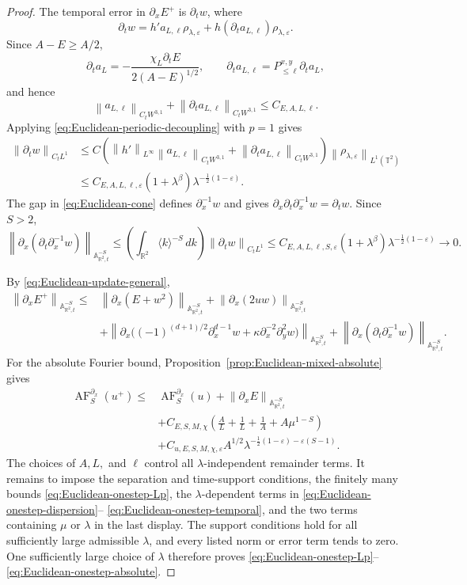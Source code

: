 \documentclass[10pt,a4paper]{amsart}
\newcommand{\A}{\mathbb A}
\newcommand{\R}{\mathbb R}
\newcommand{\T}{\mathbb T}
\newcommand{\eps}{\varepsilon}
\newcommand{\la}{\lambda}
\newcommand{\norm}[1]{\left\lVert #1\right\rVert}
\begin{document}
\begin{proof}
The temporal error in $\partial_xE^+$ is $\partial_tw$, where
\[
 \partial_tw=h'a_{L,\ell}\rho_{\la,\eps}
 +h(\partial_ta_{L,\ell})\rho_{\la,\eps}.
\]
Since $A-E\geq A/2$,
\[
 \partial_ta_L=-\frac{\chi_L\partial_tE}{2(A-E)^{1/2}},
 \qquad
 \partial_ta_{L,\ell}=P_{\leq\ell}^{x,y}\partial_ta_L,
\]
and hence
\[
 \norm{a_{L,\ell}}_{C_tW^{3,1}}
 +\norm{\partial_ta_{L,\ell}}_{C_tW^{3,1}}
 \leq C_{E,A,L,\ell}.
\]
Applying \eqref{eq:Euclidean-periodic-decoupling} with $p=1$ gives
\begin{align*}
 \norm{\partial_tw}_{C_tL^1}
 &\leq C\left(\norm{h'}_{L^\infty}
       \norm{a_{L,\ell}}_{C_tW^{3,1}}
       +\norm{\partial_ta_{L,\ell}}_{C_tW^{3,1}}\right)
       \norm{\rho_{\la,\eps}}_{L^1(\T^2)}\\
 &\leq C_{E,A,L,\ell,\eps}
       (1+\la^\beta)\la^{-\frac12(1-\eps)}.
\end{align*}
The gap in \eqref{eq:Euclidean-cone} defines $\partial_x^{-1}w$ and gives
$\partial_x\partial_t\partial_x^{-1}w=\partial_tw$.  Since $S>2$,
\begin{equation}\label{eq:Euclidean-onestep-temporal}
 \norm{\partial_x(\partial_t\partial_x^{-1}w)}
      _{\A^{-S}_{\R^2,t}}
 \leq\left(\int_{\R^2}\langle k\rangle^{-S}\,dk\right)
       \norm{\partial_tw}_{C_tL^1}
 \leq C_{E,A,L,\ell,S,\eps}
       (1+\la^\beta)\la^{-\frac12(1-\eps)}
 \longrightarrow0.
\end{equation}

By \eqref{eq:Euclidean-update-general},
\begin{align*}
 \norm{\partial_xE^+}_{\A^{-S}_{\R^2,t}}
 \leq{}&\norm{\partial_x(E+w^2)}_{\A^{-S}_{\R^2,t}}
 +\norm{\partial_x(2uw)}_{\A^{-S}_{\R^2,t}}\\
 &+\norm{\partial_x\bigl((-1)^{(d+1)/2}\partial_x^{d-1}w+
       \kappa\partial_x^{-2}\partial_y^2w)}_{\A^{-S}_{\R^2,t}}
 +\norm{\partial_x(\partial_t\partial_x^{-1}w)}
       _{\A^{-S}_{\R^2,t}}.
\end{align*}
For the absolute Fourier bound, Proposition~\ref{prop:Euclidean-mixed-absolute}
gives
\begin{align*}
 \operatorname{AF}^{\partial_x}_S(u^+)
 \leq{}&\operatorname{AF}^{\partial_x}_S(u)
 +\norm{\partial_xE}_{\A^{-S}_{\R^2,t}}\\
 &+C_{E,S,M,\chi}\left(
   \frac{A}{L}+\frac1L+\frac1A+A\mu^{1-S}\right)\\
 &+C_{u,E,S,M,\chi,\eps}A^{1/2}
 \la^{-\frac12(1-\eps)-\eps(S-1)}.
\end{align*}
The choices of $A,L,$ and $\ell$ control all $\la$-independent remainder
terms.  It remains to impose the separation and time-support conditions,
the finitely many bounds \eqref{eq:Euclidean-onestep-Lp}, the
$\la$-dependent terms in
\eqref{eq:Euclidean-onestep-dispersion}--
\eqref{eq:Euclidean-onestep-temporal}, and the two terms containing
$\mu$ or $\la$ in the last display.  The support conditions hold for all
sufficiently large admissible $\la$, and every listed norm or error term
tends to zero.  One sufficiently large choice of $\la$ therefore proves
\eqref{eq:Euclidean-onestep-Lp}--
\eqref{eq:Euclidean-onestep-absolute}.

\end{proof}
\end{document}
